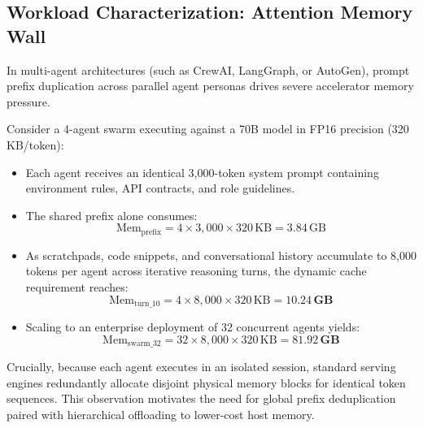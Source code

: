 \documentclass[10pt,twocolumn,letterpaper]{article}
\begin{document}
\subsection{Workload Characterization: Attention Memory Wall}
In multi-agent architectures (such as CrewAI, LangGraph, or AutoGen), prompt prefix duplication across parallel agent personas drives severe accelerator memory pressure.

Consider a 4-agent swarm executing against a 70B model in FP16 precision (320\,KB/token):
\begin{itemize}
    \item Each agent receives an identical 3,000-token system prompt containing environment rules, API contracts, and role guidelines.
    \item The shared prefix alone consumes:
    \begin{equation}
    \text{Mem}_{\text{prefix}} = 4 \times 3{,}000 \times 320\,\text{KB} = 3.84\,\text{GB}
    \end{equation}
    \item As scratchpads, code snippets, and conversational history accumulate to 8,000 tokens per agent across iterative reasoning turns, the dynamic cache requirement reaches:
    \begin{equation}
    \text{Mem}_{\text{turn\_10}} = 4 \times 8{,}000 \times 320\,\text{KB} = \mathbf{10.24\,\text{GB}}
    \end{equation}
    \item Scaling to an enterprise deployment of 32 concurrent agents yields:
    \begin{equation}
    \text{Mem}_{\text{swarm\_32}} = 32 \times 8{,}000 \times 320\,\text{KB} = \mathbf{81.92\,\text{GB}}
    \end{equation}
\end{itemize}

Crucially, because each agent executes in an isolated session, standard serving engines redundantly allocate disjoint physical memory blocks for identical token sequences. This observation motivates the need for global prefix deduplication paired with hierarchical offloading to lower-cost host memory.
\end{document}
